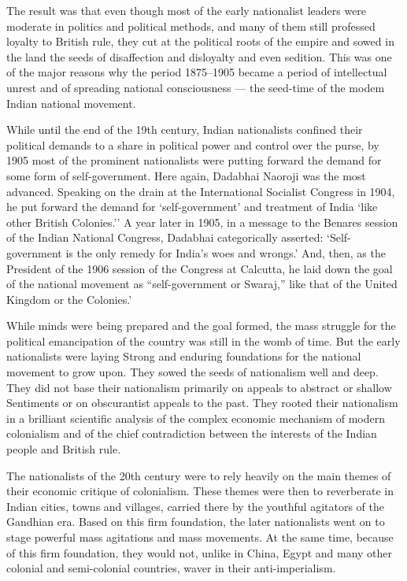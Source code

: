 The result was that even though most of the early nationalist leaders were moderate in politics and political methods, and many of them still professed loyalty to British rule, they cut at the political roots of the empire and sowed in the land the seeds of disaffection and disloyalty and even sedition. This was one of the major reasons why the period 1875--1905 became a period of intellectual unrest and of spreading national consciousness --- the seed-time of the modem Indian national movement.

While until the end of the 19th century, Indian nationalists confined their political demands to a share in political power and control over the purse, by 1905 most of the prominent nationalists were putting forward the demand for some form of self-government. Here again, Dadabhai Naoroji was the most advanced. Speaking on the drain at the International Socialist Congress in 1904, he put forward the demand for `self-government' and treatment of India `like other British Colonies.'' A year later in 1905, in a message to the Benares session of the Indian National Congress, Dadabhai categorically asserted: `Self-government is the only remedy for India's woes and wrongs.' And, then, as the President of the 1906 session of the Congress at Calcutta, he laid down the goal of the national movement as ``self-government or Swaraj,'' like that of the United Kingdom or the Colonies.'

While minds were being prepared and the goal formed, the mass struggle for the political emancipation of the country was still in the womb of time. But the early nationalists were laying Strong and enduring foundations for the national movement to grow upon. They sowed the seeds of nationalism well and deep. They did not base their nationalism primarily on appeals to abstract or shallow Sentiments or on obscurantist appeals to the past. They rooted their nationalism in a brilliant scientific analysis of the complex economic mechanism of modern colonialism and of the chief contradiction between the interests of the Indian people and British rule.

The nationalists of the 20th century were to rely heavily on the main themes of their economic critique of colonialism. These themes were then to reverberate in Indian cities, towns and villages, carried there by the youthful agitators of the Gandhian era. Based on this firm foundation, the later nationalists went on to stage powerful mass agitations and mass movements. At the same time, because of this firm foundation, they would not, unlike in China, Egypt and many other colonial and semi-colonial countries, waver in their anti-imperialism.
